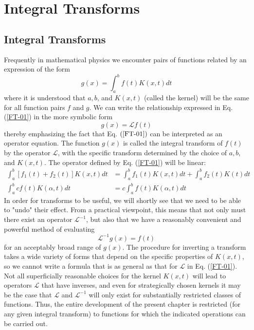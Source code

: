 \chapter{Integral Transforms }
\section{Integral Transforms}
Frequently in mathematical physics we encounter pairs of functions related by an expression of the form
\begin{equation}
g(x)=\int_{a}^{b} f(t) K(x, t) d t\label{FT-01}
\end{equation}
where it is understood that $a, b$, and $K(x, t)$ (called the kernel) will be the same for all function pairs $f$ and $g$. We can write the relationship expressed in Eq. (\ref{FT-01}) in the more symbolic form
\begin{equation}
g(x)=\mathcal{L}{ f(t)}
\end{equation}
thereby emphasizing the fact that Eq. $(\ref{FT-01})$ can be interpreted as an operator equation. The function $g(x)$ is called the integral transform of $f(t)$ by the operator $\mathcal{L}$, with the specific transform determined by the choice of $a, b$, and $K(x, t)$. The operator defined by Eq. (\ref{FT-01}) will be linear:
\begin{align}
\int_{a}^{b}\left[f_{1}(t)+f_{2}(t)\right] K(x, t) d t&=\int_{a}^{b} f_{1}(t) K(x, t) d t+\int_{a}^{b} f_{2}(t) K(t) d t \\
\int_{a}^{b} c f(t) K(\alpha, t) d t&=c \int_{a}^{b} f(t) K(\alpha, t) d t
\end{align}
In order for transforms to be useful, we will shortly see that we need to be able to "undo" their effect. From a practical viewpoint, this means that not only must there exist an operator $\mathcal{L}^{-1}$, but also that we have a reasonably convenient and powerful method of evaluating
\begin{equation}
\mathcal{L}^{-1} g(x)=f(t)
\end{equation}
for an acceptably broad range of $g(x)$. The procedure for inverting a transform takes a wide variety of forms that depend on the specific properties of $K(x, t)$, so we cannot write a formula that is as general as that for $\mathcal{L}$ in Eq. (\ref{FT-01}).\\
Not all superficially reasonable choices for the kernel $K(x, t)$ will lead to operators $\mathcal{L}$ that have inverses, and even for strategically chosen kernels it may be the case that $\mathcal{L}$ and $\mathcal{L}^{-1}$ will only exist for substantially restricted classes of functions. Thus, the entire development of the present chapter is restricted (for any given integral transform) to functions for which the indicated operations can be carried out.\\
